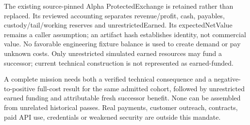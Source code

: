 \documentclass[11pt,letterpaper]{article}
\begin{document}
The existing source-pinned Alpha ProtectedExchange is retained rather than replaced. Its reviewed accounting separates revenue/profit, cash, payables, custody/tail/working reserves and unrestrictedEarned. Its expectedNetValue remains a caller assumption; an artifact hash establishes identity, not commercial value. No favorable engineering fixture balance is used to create demand or pay unknown costs. Only unrestricted simulated earned resources may fund a successor; current technical construction is not represented as earned-funded.\par
A complete mission needs both a verified technical consequence and a negative-to-positive full-cost result for the same admitted cohort, followed by unrestricted earned funding and attributable fresh successor benefit. None can be assembled from unrelated historical passes. Real payments, customer outreach, contracts, paid API use, credentials or weakened security are outside this mandate.\par
\end{document}

